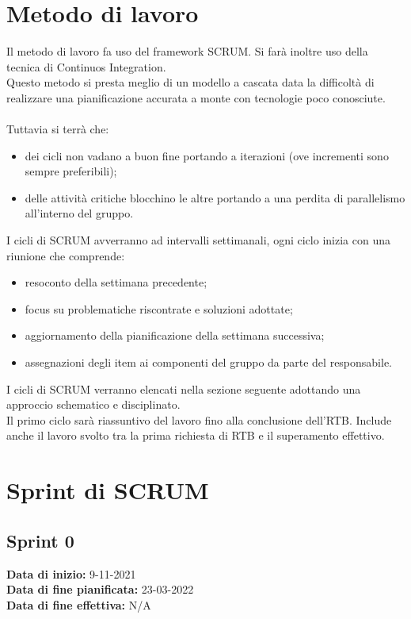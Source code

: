 \documentclass[a4paper, 12pt]{article}
\begin{document}
\section{Metodo di lavoro}
Il metodo di lavoro fa uso del framework SCRUM. Si farà inoltre uso della tecnica di Continuos Integration.\\
Questo metodo si presta meglio di un modello a cascata data la difficoltà di realizzare una pianificazione accurata a monte con tecnologie poco conosciute.\\\\
Tuttavia si terrà che:
\begin{itemize} 
    \item dei cicli non vadano a buon fine portando a iterazioni (ove incrementi sono sempre preferibili);
    \item delle attività critiche blocchino le altre portando a una perdita di parallelismo all'interno del gruppo.
\end{itemize}
I cicli di SCRUM avverranno ad intervalli settimanali, ogni ciclo inizia con una riunione che comprende:
\begin{itemize}
    \item resoconto della settimana precedente;
    \item focus su problematiche riscontrate e soluzioni adottate;
    \item aggiornamento della pianificazione della settimana successiva;
    \item assegnazioni degli item ai componenti del gruppo da parte del responsabile.
\end{itemize}
I cicli di SCRUM verranno elencati nella sezione seguente adottando una approccio schematico e disciplinato.\\
Il primo ciclo sarà riassuntivo del lavoro fino alla conclusione dell'RTB. Include anche il lavoro svolto tra la prima richiesta di RTB e il superamento effettivo.

\section{Sprint di SCRUM}

\subsection{Sprint 0}
\textbf{Data di inizio:} 9-11-2021\\
\textbf{Data di fine pianificata:} 23-03-2022\\
\textbf{Data di fine effettiva:} N/A
\end{document}
